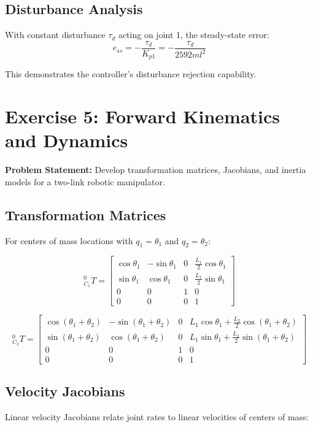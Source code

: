 \documentclass{article}
\begin{document}
\subsection*{Disturbance Analysis}

With constant disturbance $\tau_d$ acting on joint 1, the steady-state error:
\[
e_{ss} = -\frac{\tau_d}{K_{p1}} = -\frac{\tau_d}{2592 ml^2}
\]

This demonstrates the controller's disturbance rejection capability.

\section{Exercise 5: Forward Kinematics and Dynamics}

\textbf{Problem Statement:} Develop transformation matrices, Jacobians, and inertia models for a two-link robotic manipulator.

\subsection*{Transformation Matrices}

For centers of mass locations with $q_1 = \theta_1$ and $q_2 = \theta_2$:

\[
{}^{0}_{C_1}T = \begin{bmatrix} 
\cos\theta_1 & -\sin\theta_1 & 0 & \frac{L_1}{2} \cos\theta_1 \\ 
\sin\theta_1 & \cos\theta_1 & 0 & \frac{L_1}{2} \sin\theta_1 \\ 
0 & 0 & 1 & 0 \\ 
0 & 0 & 0 & 1 
\end{bmatrix}
\]

\[
{}^{0}_{C_2}T = \begin{bmatrix} 
\cos(\theta_1 + \theta_2) & -\sin(\theta_1 + \theta_2) & 0 & L_1 \cos\theta_1 + \frac{L_2}{2} \cos(\theta_1 + \theta_2) \\ 
\sin(\theta_1 + \theta_2) & \cos(\theta_1 + \theta_2) & 0 & L_1 \sin\theta_1 + \frac{L_2}{2} \sin(\theta_1 + \theta_2) \\ 
0 & 0 & 1 & 0 \\ 
0 & 0 & 0 & 1 
\end{bmatrix}
\]

\subsection*{Velocity Jacobians}

Linear velocity Jacobians relate joint rates to linear velocities of centers of mass:
\end{document}
